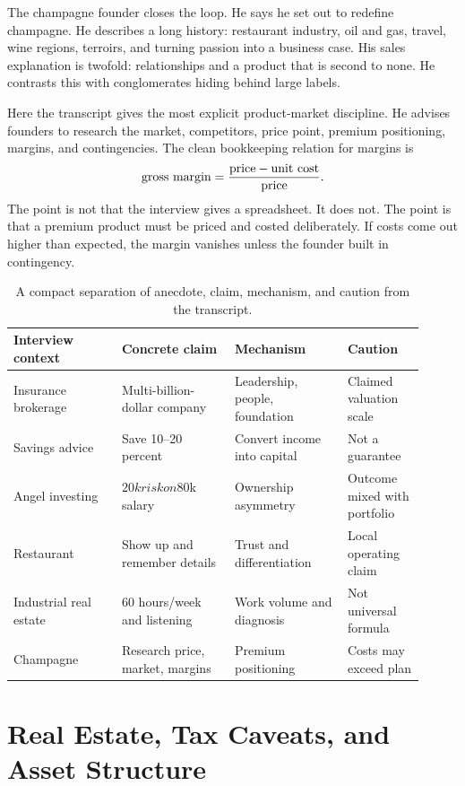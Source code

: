 The champagne founder closes the loop. He says he set out to redefine champagne. He describes a long history: restaurant industry, oil and gas, travel, wine regions, terroirs, and turning passion into a business case. His sales explanation is twofold: relationships and a product that is second to none. He contrasts this with conglomerates hiding behind large labels.

Here the transcript gives the most explicit product-market discipline. He advises founders to research the market, competitors, price point, premium positioning, margins, and contingencies. The clean bookkeeping relation for margins is
\begin{equation}
\hbox{gross margin}
=
\frac{\hbox{price}-\hbox{unit cost}}{\hbox{price}}.
\end{equation}
The point is not that the interview gives a spreadsheet. It does not. The point is that a premium product must be priced and costed deliberately. If costs come out higher than expected, the margin vanishes unless the founder built in contingency.

\begin{table}
\centering
\begin{tabular}{p{0.24\linewidth}p{0.25\linewidth}p{0.25\linewidth}p{0.17\linewidth}}
\hline
Interview context & Concrete claim & Mechanism & Caution\\
\hline
Insurance brokerage & Multi-billion-dollar company & Leadership, people, foundation & Claimed valuation scale\\
Savings advice & Save 10--20 percent & Convert income into capital & Not a guarantee\\
Angel investing & $20k risk on $80k salary & Ownership asymmetry & Outcome mixed with portfolio\\
Restaurant & Show up and remember details & Trust and differentiation & Local operating claim\\
Industrial real estate & 60 hours/week and listening & Work volume and diagnosis & Not universal formula\\
Champagne & Research price, market, margins & Premium positioning & Costs may exceed plan\\
\hline
\end{tabular}
\caption{A compact separation of anecdote, claim, mechanism, and caution from the transcript.}
\end{table}

\section{Real Estate, Tax Caveats, and Asset Structure}

